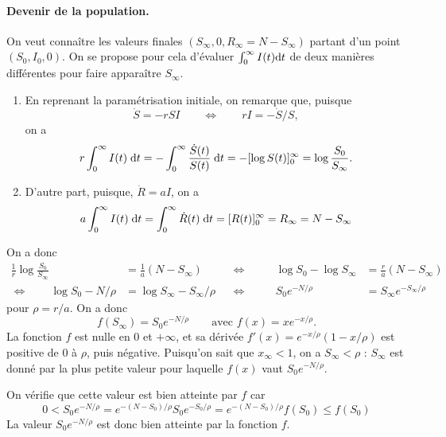 \paragraph*{Devenir de la population.}
On veut connaître les valeurs finales $(S_\infty, 0, R_\infty = N - S_\infty)$ partant d'un point $(S_0, I_0, 0)$. On se propose pour cela d'évaluer
$\int_0^\infty I(t) \text{d} t$ de deux manières différentes pour faire apparaître $S_\infty$.
\begin{enumerate}
  \item En reprenant la paramétrisation initiale, on remarque que, puisque
  $$
  \dot S = - r S I \qquad \Leftrightarrow \qquad r I = - \dot S / S,
  $$
  on a
  $$
  r \int_0^\infty I(t) \; \text{d} t
  = - \int_0^\infty \frac{\dot S(t)}{S(t)} \; \text{d} t
  = - [\log S(t)]_0^\infty
  = \log \frac{S_0}{S_\infty}.
  $$
  \item D'autre part, puisque, $\dot R = aI$, on a
  $$
  a \int_0^\infty I(t) \; \text{d} t
  = \int_0^\infty \dot R(t) \; \text{d} t
  = [R(t)]_0^\infty
  = R_\infty = N - S_\infty
  $$
\end{enumerate}
On a donc
\begin{align*}
  \frac1r \log \frac{S_0}{S_\infty} & = \frac1a (N - S_\infty) & 
  & \Leftrightarrow \qquad & 
  \log {S_0} - \log {S_\infty} & = \frac{r}a (N - S_\infty) \\
  \Leftrightarrow \qquad
  \log S_0  - N / \rho & = \log S_\infty - S_\infty / \rho &
  & \Leftrightarrow \qquad &
  S_0 e^{- N / \rho}& = S_\infty e^{- S_\infty/\rho} 
\end{align*}
pour $\rho = r/a$. On a donc
$$
f(S_\infty) = S_0 e^{- N / \rho}
\qquad \text{avec } f(x) = x e^{-x/\rho}.
$$
La fonction $f$ est nulle en 0 et $+\infty$, et sa dérivée $f'(x) = e^{-x/\rho}(1 - x/\rho)$ est positive de 0 à $\rho$, puis négative.
Puisqu'on sait que $x_\infty  < 1$, on a $S_\infty < \rho$ : $S_\infty$ est donné par la plus petite valeur pour laquelle $f(x)$ vaut $S_0 e^{- N / \rho}$.

On vérifie que cette valeur est bien atteinte par $f$ car
$$
0 
< S_0 e^{-N/\rho} 
= e^{-(N - S_0)/\rho} S_0 e^{-S_0 / \rho}  = e^{-(N - S_0)/\rho} f(S_0) \leq f(S_0)
$$
La valeur $S_0 e^{-N/\rho}$ est donc bien atteinte par la fonction $f$.
